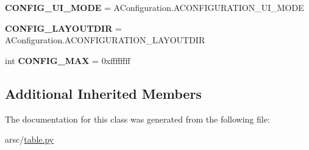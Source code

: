\begin{DoxyCompactItemize}
{\bfseries C\+O\+N\+F\+I\+G\+\_\+\+U\+I\+\_\+\+M\+O\+DE} = A\+Configuration.\+A\+C\+O\+N\+F\+I\+G\+U\+R\+A\+T\+I\+O\+N\+\_\+\+U\+I\+\_\+\+M\+O\+DE
\item 
\mbox{\label{classtable_1_1ResTable__config_1_1Config_a362f7d4c566c661842bfd1c19f9d6c6c}} 
{\bfseries C\+O\+N\+F\+I\+G\+\_\+\+L\+A\+Y\+O\+U\+T\+D\+IR} = A\+Configuration.\+A\+C\+O\+N\+F\+I\+G\+U\+R\+A\+T\+I\+O\+N\+\_\+\+L\+A\+Y\+O\+U\+T\+D\+IR
\item 
\mbox{\label{classtable_1_1ResTable__config_1_1Config_a79cfe95310904d78e2b6c398730b4069}} 
int {\bfseries C\+O\+N\+F\+I\+G\+\_\+\+M\+AX} = 0xffffffff
\end{DoxyCompactItemize}
\subsection*{Additional Inherited Members}


The documentation for this class was generated from the following file\+:\begin{DoxyCompactItemize}
\item 
arsc/\mbox{\hyperlink{table_8py}{table.\+py}}\end{DoxyCompactItemize}
